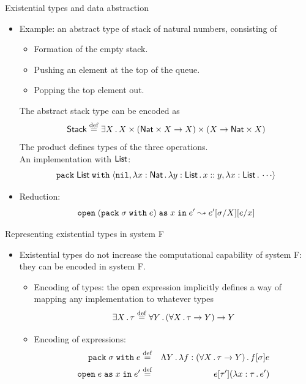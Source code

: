 \documentclass[paper=screen,mode=present,style=zysimple]{powerdot}
\begin{document}
\begin{slide}{Existential types and data abstraction}
\begin{itemize}
\item Example: an abstract type of stack of natural numbers, consisting of 
\begin{itemize}
\item Formation of the empty stack.
\item Pushing an element at the top of the queue.
\item Popping the top element out.
\end{itemize}
The abstract stack type can be encoded as
\[
\mathsf{Stack} \stackrel{\mathrm{def}}{=} \exists X \, . \, X \times (\mathsf{Nat} \times X \to X) \times (X \to \mathsf{Nat} \times X)
\]
The product defines types of the three operations. \\
An implementation with $\mathsf{List}$:
\[
\mathtt{pack} \; \tlist \; \mathtt{with} \;
\cpair{\cnil, \lambda x : \tnat \ldot \lambda y : \tlist  \ldot x :: y, 
\lambda x : \tlist \ldot \cdots }
\vspace*{-2em}
\]
\item Reduction: 
\[
\mathtt{open} \; (\mathtt{pack} \; \sigma \; \mathtt{with} \; e) \; \mathtt{as} \; x \; 
\mathtt{in} \; e' \leadsto 
e'[\sigma / X] [e / x]
\]
\end{itemize}
\end{slide}

\begin{slide}{Representing existential types in system F}
\begin{itemize}
\item Existential types do not increase the computational capability of system F: 
they can be encoded in system F.
\begin{itemize}
\item Encoding of types: the $\mathtt{open}$ expression implicitly defines a way of mapping 
  any implementation to whatever types
\[
\exists X \ldot \tau \defeq \forall Y \ldot (\forall X \ldot \tau \to Y) \to Y 
\vspace*{-1.5em}
\]
\item Encoding of expressions:
\begin{eqnarray*}
\mathtt{pack} \; \sigma \; \mathtt{with} \; e & \stackrel{\mathrm{def}}{=} & 
\Lambda Y \, . \, \lambda f : (\forall X \, . \, \tau \to Y) \, . \, f [\sigma] e 
\\
\mathtt{open} \; e \; \mathtt{as} \; x \; \mathtt{in} \; e' & \stackrel{\mathrm{def}}{=} & 
e [\tau'] (\lambda x : \tau \, . \, e')
\end{eqnarray*}
\end{itemize}
\end{itemize}
\end{slide}
\end{document}
